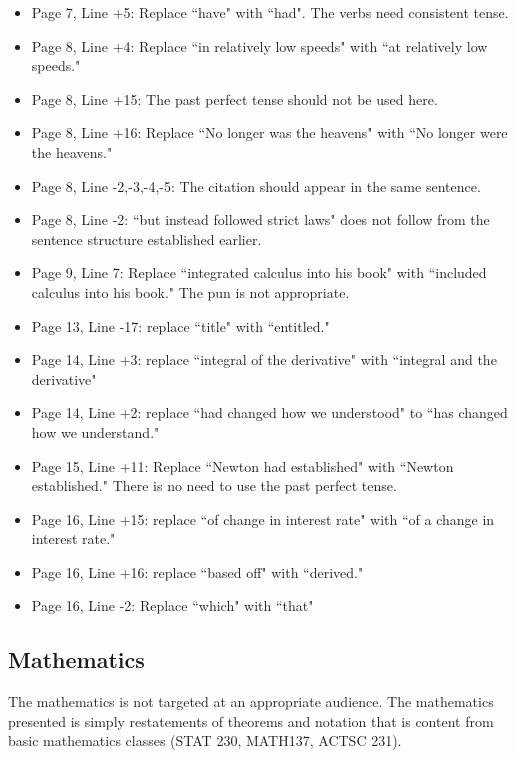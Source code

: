 \documentclass[11pt]{article}
\begin{document}
\begin{itemize}
\begin{itemize}
		\item Page 7, Line +5: Replace ``have" with ``had". The verbs need consistent tense.
		\item Page 8, Line +4: Replace ``in relatively low speeds" with ``at relatively low speeds."
		\item Page 8, Line +15: The past perfect tense should not be used here.
		\item Page 8, Line +16: Replace ``No longer was the heavens" with ``No longer were the heavens."
		\item Page 8, Line -2,-3,-4,-5: The citation should appear in the same sentence.
		\item Page 8, Line -2: ``but instead followed strict laws" does not follow from the sentence structure established earlier. 
		\item Page 9, Line 7: Replace ``integrated calculus into his book" with ``included calculus into his book." The pun is not appropriate. 
		\item Page 13, Line -17: replace ``title" with ``entitled." 
		\item Page 14, Line +3: replace ``integral of the derivative" with ``integral and the derivative"
		\item Page 14, Line +2: replace ``had changed how we understood" to ``has changed how we understand." 
		\item Page 15, Line +11: Replace ``Newton had established" with ``Newton established." There is no need to use the past perfect tense. 
		\item Page 16, Line +15: replace ``of change in interest rate" with ``of a change in interest rate." 
		\item Page 16, Line +16: replace ``based off" with ``derived."
		\item Page 16, Line -2: Replace ``which" with ``that"		
		
		
	\end{itemize}
\end{itemize}

\subsection*{Mathematics}

The mathematics is not targeted at an appropriate audience. The mathematics presented is simply restatements of theorems and notation that is content from basic mathematics classes (STAT 230, MATH137, ACTSC 231). 
\end{document}
